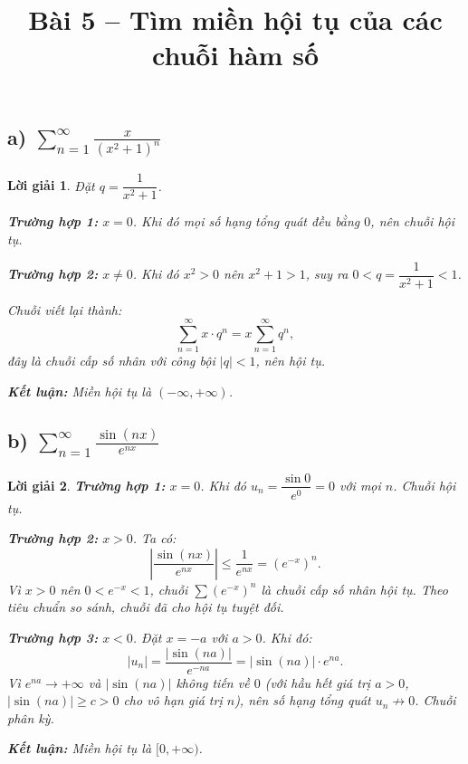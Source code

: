 \documentclass[12pt,a4paper]{article}
\title{\textbf{Bài 5 -- Tìm miền hội tụ của các chuỗi hàm số}}
\author{}
\date{}
\newtheorem*{solution}{Lời giải}
\begin{document}
\maketitle

\subsection*{a) $\displaystyle\sum_{n=1}^{\infty}\frac{x}{\left(x^{2}+1\right)^{n}}$}

\begin{solution}
Đặt $q = \dfrac{1}{x^{2}+1}$.

\textbf{Trường hợp 1:} $x = 0$. Khi đó mọi số hạng tổng quát đều bằng $0$, nên chuỗi hội tụ.

\textbf{Trường hợp 2:} $x \neq 0$. Khi đó $x^{2} > 0$ nên $x^{2}+1 > 1$, suy ra $0 < q = \dfrac{1}{x^{2}+1} < 1$.

Chuỗi viết lại thành:
\[
\sum_{n=1}^{\infty} x \cdot q^{n} = x \sum_{n=1}^{\infty} q^{n},
\]
đây là chuỗi cấp số nhân với công bội $|q| < 1$, nên hội tụ.

\textbf{Kết luận:} Miền hội tụ là $\boxed{(-\infty, +\infty)}$.
\end{solution}

\subsection*{b) $\displaystyle\sum_{n=1}^{\infty}\frac{\sin(nx)}{e^{nx}}$}

\begin{solution}
\textbf{Trường hợp 1:} $x = 0$. Khi đó $u_n = \dfrac{\sin 0}{e^{0}} = 0$ với mọi $n$. Chuỗi hội tụ.

\textbf{Trường hợp 2:} $x > 0$. Ta có:
\[
\left|\frac{\sin(nx)}{e^{nx}}\right| \leq \frac{1}{e^{nx}} = \left(e^{-x}\right)^{n}.
\]
Vì $x > 0$ nên $0 < e^{-x} < 1$, chuỗi $\sum \left(e^{-x}\right)^{n}$ là chuỗi cấp số nhân hội tụ. Theo tiêu chuẩn so sánh, chuỗi đã cho hội tụ tuyệt đối.

\textbf{Trường hợp 3:} $x < 0$. Đặt $x = -a$ với $a > 0$. Khi đó:
\[
\left|u_n\right| = \frac{|\sin(na)|}{e^{-na}} = |\sin(na)| \cdot e^{na}.
\]
Vì $e^{na} \to +\infty$ và $|\sin(na)|$ không tiến về $0$ (với hầu hết giá trị $a > 0$, $|\sin(na)| \geq c > 0$ cho vô hạn giá trị $n$), 
nên số hạng tổng quát $u_n \not\to 0$. Chuỗi phân kỳ.

\textbf{Kết luận:} Miền hội tụ là $\boxed{[0, +\infty)}$.
\end{solution}
\end{document}
